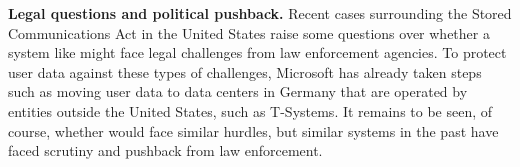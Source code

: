 \textbf{Legal questions and political pushback.} Recent cases surrounding
the Stored Communications Act in the United States raise some questions over
whether a system like \system{} might face legal challenges from law
enforcement agencies. To protect user data against these types of challenges,
Microsoft has already taken steps such as moving user data to data centers in
Germany that are operated by entities outside the United States, such as
T-Systems. It remains to be seen, of course, whether \system{} would face similar
hurdles, but similar systems in the past have faced scrutiny and pushback from law
enforcement.
